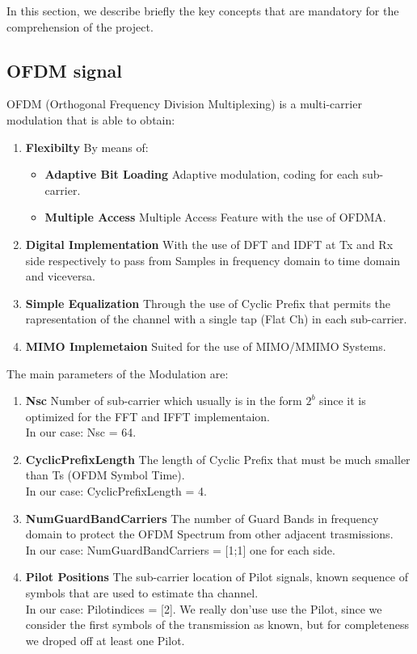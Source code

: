 In this section, we describe briefly the key concepts that 
are mandatory for the comprehension of the project.

\subsection{OFDM signal}

OFDM (Orthogonal Frequency Division Multiplexing)
is a multi-carrier modulation that is able to obtain:
\begin{enumerate}
    \item \textbf{Flexibilty} By means of:
    \begin{itemize}
        \item   \textbf{Adaptive Bit Loading} Adaptive modulation, coding for each sub-carrier.
        \item   \textbf{Multiple Access} Multiple Access Feature with the use of OFDMA.
    \end{itemize}
    \item \textbf{Digital Implementation} With the use of DFT and IDFT at Tx and Rx side respectively to pass from Samples in frequency domain to time domain and viceversa.
    \item \textbf{Simple Equalization} Through the use of Cyclic Prefix that permits the rapresentation of the channel with a single tap (Flat Ch) in each sub-carrier.
    \item \textbf{MIMO Implemetaion} Suited for the use of MIMO/MMIMO Systems.
\end{enumerate}

The main parameters of the Modulation are:
\begin{enumerate}
    \item \textbf{Nsc} Number of sub-carrier which usually is in the form $2^{b}$ since it is optimized for the FFT and IFFT implementaion.\\
                        In our case: Nsc = 64.
    \item \textbf{CyclicPrefixLength} The length of Cyclic Prefix that must be much smaller than Ts (OFDM Symbol Time).\\
                        In our case: CyclicPrefixLength = 4.
    \item \textbf{NumGuardBandCarriers} The number of Guard Bands in frequency domain to protect the OFDM Spectrum from other adjacent trasmissions.\\
                        In our case: NumGuardBandCarriers = [1;1] one for each side.
    \item \textbf{Pilot Positions} The sub-carrier location of Pilot signals, known sequence of symbols that are used to estimate tha channel.\\
                        In our case: Pilotindices = [2]. We really don'use use the Pilot, since we consider the first symbols of the transmission as known, but for completeness we droped off at least one Pilot.
\end{enumerate}


